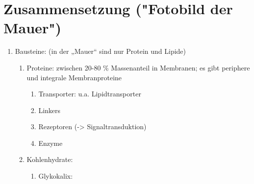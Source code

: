 \section{Zusammensetzung ("Fotobild der Mauer")}

\begin{enumerate}
\item Bausteine: (in der „Mauer“ sind nur Protein und Lipide)
\begin{enumerate}
\item Proteine: zwischen 20-80 \% Massenanteil in Membranen; es gibt periphere und integrale Membranproteine

\begin{enumerate}
\item Transporter: u.a. Lipidtransporter 
\item Linkers 
\item Rezeptoren (-> Signaltransduktion)
\item Enzyme
\end{enumerate}
\item Kohlenhydrate: 
\begin{enumerate}
    \item Glykokalix: 

\end{enumerate}

\end{enumerate}
\end{enumerate}